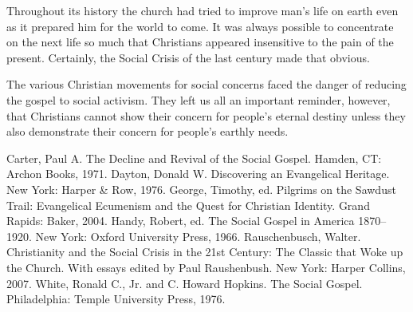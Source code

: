 Throughout its history the church had tried to improve man’s life on earth even as it prepared him
for the world to come. It was always possible to concentrate on the next life so much that
Christians appeared insensitive to the pain of the present. Certainly, the Social Crisis of the last
century made that obvious.

The various Christian movements for social concerns faced the danger of reducing the gospel to
social activism. They left us all an important reminder, however, that Christians cannot show their
concern for people’s eternal destiny unless they also demonstrate their concern for people’s earthly
needs.

\begin{readinglist}
\entry Carter, Paul A. The Decline and Revival of the Social Gospel. Hamden, CT: Archon Books, 1971.
\entry Dayton, Donald W. Discovering an Evangelical Heritage. New York: Harper \& Row, 1976.
\entry George, Timothy, ed. Pilgrims on the Sawdust Trail: Evangelical Ecumenism and the Quest for
  Christian Identity. Grand Rapids: Baker, 2004.
\entry Handy, Robert, ed. The Social Gospel in America 1870–1920. New York: Oxford University Press,
  1966.
\entry *Rauschenbusch, Walter. Christianity and the Social Crisis in the 21st Century: The Classic
  that Woke up the Church. With essays edited by Paul Raushenbush. New York: Harper Collins, 2007.
\entry White, Ronald C., Jr. and C. Howard Hopkins. The Social Gospel. Philadelphia: Temple
  University Press, 1976.
\end{readinglist}
